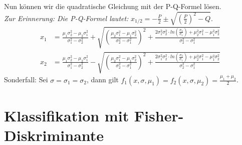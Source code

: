 \documentclass[12pt]{article}
\begin{document}
Nun k\"onnen wir die quadratische Gleichung mit der P-Q-Formel l\"osen.\\
\textit{Zur Erinnerung: Die P-Q-Formel lautet:} $x_{1/2} = -\frac{P}{2} \pm \sqrt{\left(\frac{P}{2}\right)^2 - Q}$.
\begin{align*}
x_1 &= \frac{\mu_1\sigma_2^2 - \mu_2\sigma_1^2}{\sigma_1^2-\sigma_2^2} + \sqrt{\left( \frac{\mu_2\sigma_1^2 - \mu_1\sigma_2^2}{\sigma_2^2-\sigma_1^2} \right)^2 + \frac{2 \sigma_1^2 \sigma_2^2 \cdot ln \left(\frac{\sigma_2}{\sigma_1}\right) + \mu_2^2\sigma_1^2 - \mu_1^2\sigma_2^2}{\sigma_2^2-\sigma_1^2}}\\
x_2 &= \frac{\mu_1\sigma_2^2 - \mu_2\sigma_1^2}{\sigma_1^2-\sigma_2^2} - \sqrt{\left( \frac{\mu_2\sigma_1^2 - \mu_1\sigma_2^2}{\sigma_2^2-\sigma_1^2} \right)^2 + \frac{2 \sigma_1^2 \sigma_2^2 \cdot ln \left(\frac{\sigma_2}{\sigma_1}\right) + \mu_2^2\sigma_1^2 - \mu_1^2\sigma_2^2}{\sigma_2^2-\sigma_1^2}}
\end{align*}
Sonderfall: Sei $\sigma = \sigma_1 = \sigma_2$, dann gilt $f_1(x,\sigma,\mu_1) = f_2(x,\sigma,\mu_2) = \frac{\mu_1+\mu_2}{2}$.
\newpage

\section{Klassifikation mit Fisher-Diskriminante}
\end{document}
